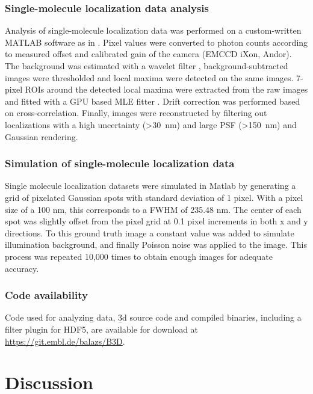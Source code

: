 \subsubsection{Single-molecule localization data analysis}
Analysis of single-molecule localization data was performed on a custom-written MATLAB software as in \cite{deschamps_efficient_2016}. Pixel values were converted to photon counts according to measured offset and calibrated gain of the camera (EMCCD iXon, Andor). The background was estimated with a wavelet filter \cite{izeddin_wavelet_2012}, background-subtracted images were thresholded and local maxima were detected on the same images. 7-pixel ROIs around the detected local maxima were extracted from the raw images and fitted with a GPU based MLE fitter \cite{smith_fast_2010}. Drift correction was performed based on cross-correlation. Finally, images were
reconstructed by filtering out localizations with a high uncertainty (>\SI{30}{nm}) and large PSF (>\SI{150}{nm}) and Gaussian rendering.

\subsubsection{Simulation of single-molecule localization data}
Single molecule localization datasets were simulated in Matlab by generating a grid of pixelated Gaussian spots with standard deviation of 1 pixel. With a pixel size of a 100 nm, this corresponds to a FWHM of 235.48 nm. The center of each spot was slightly offset from the pixel grid at 0.1 pixel increments in both x and y directions. To this ground truth image a constant value was added to simulate illumination background, and finally Poisson noise was applied to the image. This process was repeated 10,000 times to obtain enough images for adequate accuracy.

\subsubsection{Code availability}
Code used for analyzing data, \b3d source code and compiled binaries, including a filter plugin for HDF5, are available for download at \url{https://git.embl.de/balazs/B3D}.






\section{Discussion}

